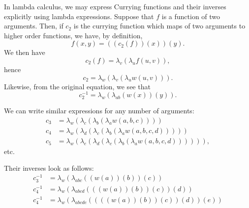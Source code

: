 \documentclass[12pt]{article}
\begin{document}
In lambda calculus, we may express Currying functions and their inverses
explicitly using lambda expressions.  Suppose that $f$ is a function
of two arguments.  Then, if $c_2$ is the currying function which maps
of two arguments to higher order functions, we have, by definition,
\[
f(x, y) = ((c_2 (f)) (x)) (y).
\]
We then have
\[
c_2 (f) = \lambda_v (\lambda_u f(u,v)) ,
\]
hence
\[
c_2 = \lambda_w (\lambda_v (\lambda_u w(u,v))).
\]
Likewise, from the original equation, we see that
\[
c_2^{-1} = \lambda_w (\lambda_{ab} (w(x))(y)) .
\]

We can write similar expressions for any number of arguments:
\begin{align*}
c_3 &= \lambda_w (\lambda_c (\lambda_b (\lambda_a w(a,b,c)))) \\
c_4 &= \lambda_w (\lambda_d (\lambda_c (\lambda_b (\lambda_a w(a,b,c,d))))) \\
c_5 &= \lambda_w (\lambda_e (\lambda_d (\lambda_c (\lambda_b (\lambda_a w(a,b,c,d)))))) ,
\end{align*}
etc.

Their inverses look as follows:
\begin{align*}
c_3^{-1} &= \lambda_w (\lambda_{abc} ((w(a))(b))(c)) \\
c_4^{-1} &= \lambda_w (\lambda_{abcd} (((w(a))(b))(c))(d)) \\
c_4^{-1} &= \lambda_w (\lambda_{abcde} ((((w(a))(b))(c))(d))(e))
\end{align*}
\end{document}
